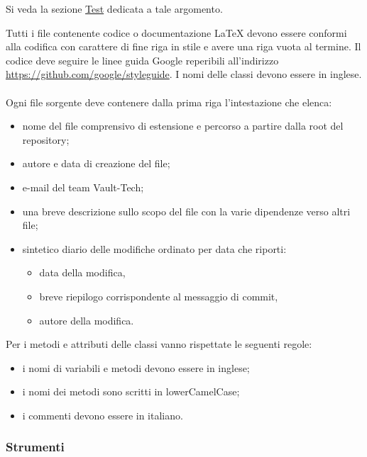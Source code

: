 \documentclass[a4paper, titlepage]{article}
\begin{document}
Si veda la sezione \hyperref[sez:test]{Test} dedicata a tale argomento.

Tutti i file contenente codice o documentazione \LaTeX{} devono essere conformi alla codifica  con carattere di fine riga in stile  e avere una riga vuota al termine.
Il codice deve seguire le linee guida Google reperibili all'indirizzo \url{https://github.com/google/styleguide}. I nomi delle classi devono essere in inglese.
\\
\\ Ogni file sorgente deve contenere dalla prima riga l'intestazione che elenca:
\begin{itemize}
	\item nome del file comprensivo di estensione e percorso a partire dalla root del repository;
	\item autore e data di creazione del file;
	\item e-mail del team Vault-Tech;
	\item una breve descrizione sullo scopo del file con la varie dipendenze verso altri file;
	\item sintetico diario delle modifiche ordinato per data che riporti:
	\begin{itemize}
		\item data della modifica,
		\item breve riepilogo corrispondente al messaggio di commit,
		\item autore della modifica.
	\end{itemize}
\end{itemize}

Per i metodi e attributi delle classi vanno rispettate le seguenti regole:
\begin{itemize}
	\item i nomi di variabili e metodi devono essere in inglese;
	\item i nomi dei metodi sono scritti in lowerCamelCase;
	\item i commenti devono essere in italiano.
\end{itemize}

\subsubsection{Strumenti}
\end{document}
